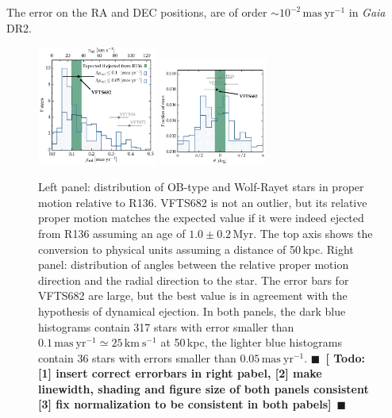 \documentclass[apjl,twocolumn]{emulateapj}
\newcommand{\todo}[1]{{\large $\blacksquare$~\textbf{\color{red}[#1]}}~$\blacksquare$}
\newcommand{\kms}{{\,\mathrm{km\ s^{-1}}}}
\DeclareRobustCommand{\Secref}[1]{Sec.~\ref{#1}}
\begin{document}
\begin{table}
\begin{center}
\begin{tabular}{ll|c|c}
     

      \hline

    \end{tabular}
    \tablecomments
    {The error on the RA and DEC positions, are of order
      $\sim$$10^{-2}\,\mathrm{mas\ yr^{-1}}$ in \emph{Gaia}
      DR2. %
    }
  \end{center}
  \label{tab:vfts682}
\end{table}



\begin{figure}[htbp]
  \centering
  \includegraphics[width=0.35\textwidth]{figures/dist_mu_region.pdf}
  \includegraphics[width=0.315\textwidth]{figures/angle_dist}
  \caption{Left panel: distribution of OB-type and Wolf-Rayet stars in proper
    motion relative to R136. VFTS682 is not an outlier, but
    its relative proper motion matches the expected value if it were indeed
    ejected from R136 assuming an age of $1.0\pm0.2$\,Myr. The top axis shows the conversion to physical units
    assuming a distance of 50\,kpc. Right panel:  distribution of
    angles between the relative proper motion direction and the radial
    direction to the star. The error bars for VFTS682 are large, but
    the best value is in agreement with the hypothesis of dynamical
    ejection. In both
    panels, the dark blue histograms contain 317 
    stars with error smaller than $0.1\,\mathrm{mas \
      yr^{-1}}\simeq25\,\mathrm{km\ s^{-1}}$ at 50\,kpc, the
    lighter blue histograms contain 36 stars with errors smaller than $0.05\,\mathrm{mas \
      yr^{-1}}$. \todo{ Todo: [1] insert correct errorbars in right pabel, [2] make linewidth, shading and figure size of both panels consistent [3] fix normalization to be consistent in both pabels}}
  \label{fig:mu_dist}
\end{figure}
\end{document}
